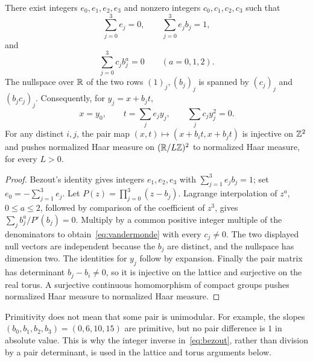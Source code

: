 \begin{lemma}\label{lem:algebra}
There exist integers $e_0,e_1,e_2,e_3$ and nonzero integers
$c_0,c_1,c_2,c_3$ such that
\begin{equation}\label{eq:bezout}
 \sum_{j=0}^3e_j=0,\qquad \sum_{j=0}^3e_jb_j=1,
\end{equation}
and
\begin{equation}\label{eq:vandermonde}
 \sum_{j=0}^3c_jb_j^a=0\qquad(a=0,1,2).
\end{equation}
The nullspace over $\mathbb R$ of the two rows $(1)_j,(b_j)_j$ is spanned
by $(c_j)_j$ and $(b_jc_j)_j$.
Consequently, for $y_j=x+b_jt$,
\[
 x=y_0,\qquad t=\sum_je_jy_j,\qquad \sum_jc_jy_j^2=0.
\]
For any distinct $i,j$, the pair map
$(x,t)\mapsto(x+b_it,x+b_jt)$ is injective on $\mathbb Z^2$ and pushes
normalized Haar measure on $(\mathbb R/L\mathbb Z)^2$ to normalized Haar measure,
for every $L>0$.
\end{lemma}

\begin{proof}
Bezout's identity gives integers $e_1,e_2,e_3$ with
$\sum_{j=1}^3e_jb_j=1$; set $e_0=-\sum_{j=1}^3e_j$.
Let $P(z)=\prod_{j=0}^3(z-b_j)$. Lagrange interpolation of $z^a$,
$0\le a\le2$, followed by comparison of the coefficient of $z^3$,
gives
$\sum_jb_j^a/P'(b_j)=0$. Multiply by a common positive integer
multiple of the denominators to obtain~\eqref{eq:vandermonde} with
every $c_j\ne0$. The two displayed null vectors are independent
because the $b_j$ are distinct, and the nullspace has dimension two.
The identities for $y_j$ follow by expansion. Finally the pair matrix
has determinant $b_j-b_i\ne0$, so it is injective on the lattice and
surjective on the real torus. A surjective continuous homomorphism of
compact groups pushes normalized Haar measure to normalized Haar
measure.
\end{proof}

\begin{remark}\label{rem:nonunimodular}
Primitivity does not mean that some pair is unimodular. For example,
the slopes $(b_0,b_1,b_2,b_3)=(0,6,10,15)$ are primitive, but no pair
difference is $1$ in absolute value. This is why the integer inverse
in~\eqref{eq:bezout}, rather than division by a pair determinant,
is used in the lattice and torus arguments below.
\end{remark}


